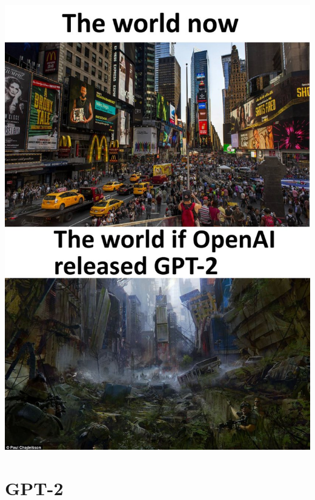 \documentclass{beamer}
\begin{document}
\begin{frame}
    \begin{center}
        \includegraphics[scale=0.18]{img/gpt2_mem1.jpg}
    \end{center}
\end{frame}


\section{GPT-2}
\end{document}
